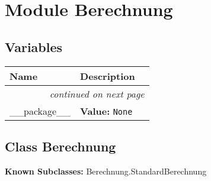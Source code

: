 %
%
%


\section{Module Berechnung}

    \label{Berechnung}


  \subsection{Variables}

    \vspace{-1cm}
\hspace{\varindent}\begin{longtable}{|p{\varnamewidth}|p{\vardescrwidth}|l}
\cline{1-2}
\cline{1-2} \centering \textbf{Name} & \centering \textbf{Description}& \\
\cline{1-2}
\endhead\cline{1-2}\multicolumn{3}{r}{\small\textit{continued on next page}}\\\endfoot\cline{1-2}
\endlastfoot\raggedright \_\-\_\-p\-a\-c\-k\-a\-g\-e\-\_\-\_\- & \raggedright \textbf{Value:} 
{\tt None}&\\
\cline{1-2}
\end{longtable}



\subsection{Class Berechnung}

    \label{Berechnung:Berechnung}
\textbf{Known Subclasses:} Berechnung.StandardBerechnung



